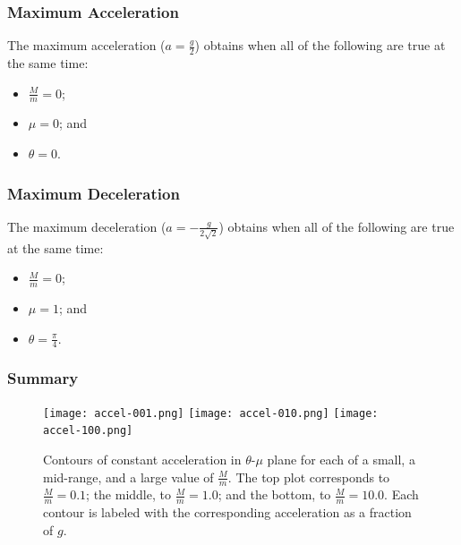\documentclass[twocolumn]{article}
\begin{document}
\subsubsection{Maximum Acceleration}

The maximum acceleration ($a = \tfrac{g}{2}$) obtains when all of the following
are true at the same time:
\begin{itemize}[noitemsep]
   \item $\tfrac{M}{m} = 0$;
   \item $\mu = 0$; and
   \item $\theta = 0$.
\end{itemize}

\subsubsection{Maximum Deceleration}

The maximum deceleration ($a = -\tfrac{g}{2\sqrt{2}}$) obtains when all of the
following are true at the same time:
\begin{itemize}[noitemsep]
   \item $\tfrac{M}{m} = 0$;
   \item $\mu = 1$; and
   \item $\theta = \tfrac{\pi}{4}$.
\end{itemize}

\subsubsection{Summary}

\begin{figure}
   \begin{center}
      \texttt{[image: accel-001.png]}
      \texttt{[image: accel-010.png]}
      \texttt{[image: accel-100.png]}
   \end{center}
   \caption{Contours of constant acceleration in $\theta$-$\mu$ plane for each
            of a small, a mid-range, and a large value of $\tfrac{M}{m}$. The
            top plot corresponds to $\tfrac{M}{m} = 0.1$; the middle, to
            $\tfrac{M}{m} = 1.0$; and the bottom, to $\tfrac{M}{m} = 10.0$.
            Each contour is labeled with the corresponding acceleration as a
            fraction of $g$.}
   \label{fig:accel}
\end{figure}
\end{document}
